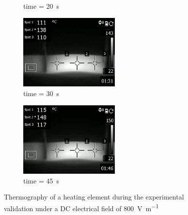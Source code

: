 \documentclass[11pt,review,times]{elsarticle}
\begin{document}
\begin{figure}[htb]
\begin{subfigure}{55mm}
		\caption{time = \SI{20}{\s}}
		\label{fig:results_lab_20s}
	\end{subfigure}
	\begin{subfigure}{55mm}
		\center
		\captionsetup{width=50mm}
		\includegraphics[width=50mm]{Fig3e.png}
		\caption{time = \SI{30}{\s}}
		\label{fig:results_lab_30s}
	\end{subfigure}
	\begin{subfigure}{55mm}
		\center
		\captionsetup{width=50mm}
		\includegraphics[width=50mm]{Fig3f.png}
		\caption{time = \SI{45}{\s}}
		\label{fig:results_lab_45s}
	\end{subfigure}
	\caption{Thermography of a heating element during the experimental validation under a DC electrical field of \SI{800}{\volt\per\metre} \cite{Brassard2018_figshare_article1}}
	\label{fig:results_lab}
\end{figure}
\end{document}
